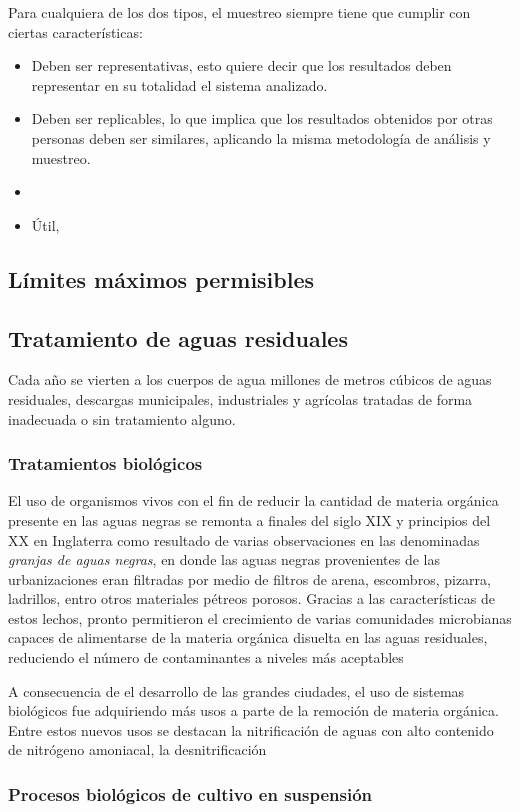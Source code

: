 Para cualquiera de los dos tipos, el muestreo siempre tiene que cumplir con ciertas características:
\begin{itemize}
	\item Deben ser representativas, esto quiere decir que los resultados deben representar en su totalidad el sistema analizado.
	\item Deben ser replicables, lo que implica que los resultados obtenidos por otras personas deben ser similares, aplicando la misma metodología de análisis y muestreo.
	\item 
	\item Útil, 
\end{itemize}
\subsection{Límites máximos permisibles}\label{NOM2021}
\subsection{Tratamiento de aguas residuales}
Cada año se vierten a los cuerpos de agua millones de metros cúbicos de aguas residuales, descargas municipales, industriales y agrícolas tratadas de forma inadecuada o sin tratamiento alguno.
\subsubsection{Tratamientos biológicos}
El uso de organismos vivos con el fin de reducir la cantidad de materia orgánica presente en las aguas negras se remonta a finales del siglo XIX y principios del XX en Inglaterra como resultado de varias observaciones en las denominadas \emph{granjas de aguas negras}, en donde las aguas negras provenientes de las urbanizaciones eran filtradas por medio de filtros de arena, escombros, pizarra, ladrillos, entro otros materiales pétreos porosos. Gracias a las características de estos lechos, pronto permitieron el crecimiento de varias comunidades microbianas capaces de alimentarse de la materia orgánica disuelta en las aguas residuales, reduciendo el número de contaminantes a niveles más aceptables~\citep{Fair2008}\par
A consecuencia de el desarrollo de las grandes ciudades, el uso de sistemas biológicos fue adquiriendo más usos a parte de la remoción de materia orgánica. Entre estos nuevos usos se destacan la nitrificación de aguas con alto contenido de nitrógeno amoniacal, la desnitrificación 
\subsubsection{Procesos biológicos de cultivo en suspensión}
